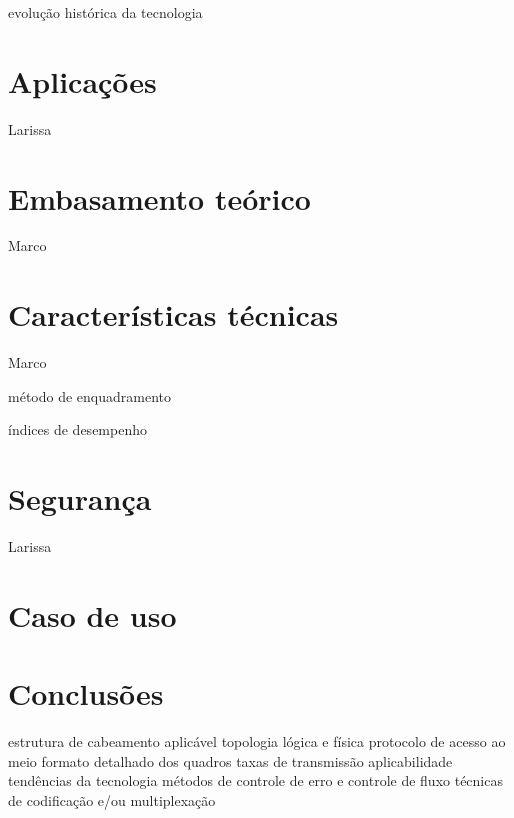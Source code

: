 \documentclass[12pt, a4paper]{article}
\begin{document}
evolução histórica da tecnologia

\section{Aplicações}
Larissa

\section{Embasamento teórico}
Marco

\section{Características técnicas}
Marco

método de enquadramento

índices de desempenho

\section{Segurança}
Larissa

\section{Caso de uso}



\section{Conclusões}

estrutura de cabeamento aplicável
topologia lógica e física
protocolo de acesso ao meio
formato detalhado dos quadros
taxas de transmissão
aplicabilidade
tendências da tecnologia
métodos de controle de erro e controle de fluxo
técnicas de codificação e/ou multiplexação


\end{document}
